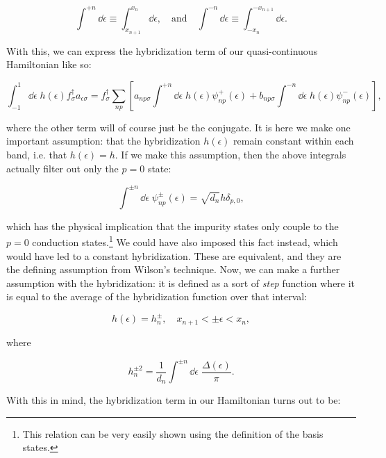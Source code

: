 \begin{equation}
  \int^{+n}\dd\epsilon \equiv \int_{x_{n+1}}^{x_n}\dd\epsilon, \quad\text{and}\quad \int^{-n}\dd\epsilon \equiv \int_{-x_n}^{-x_{n+1}}\dd\epsilon.
\end{equation}

With this, we can express the hybridization term of our quasi-continuous Hamiltonian like so:

\begin{equation}
  \int_{-1}^1\dd\epsilon \; h(\epsilon) f^\dagger_\sigma a_{\epsilon\sigma} = f^\dagger_\sigma \sum_{np} \left[ a_{np\sigma}\int^{+n}\dd\epsilon \; h(\epsilon)\psi^+_{np}(\epsilon) + b_{np\sigma}\int^{-n}\dd\epsilon \; h(\epsilon) \psi^-_{np}(\epsilon) \right],
\end{equation}

where the other term will of course just be the conjugate. It is here we make one important assumption: that the hybridization $h(\epsilon)$ remain constant within each band, i.e. that $h(\epsilon) = h$. If we make this assumption, then the above integrals actually filter out only the $p=0$ state:

\begin{equation}
  \int^{\pm n}\dd\epsilon \; \psi^{\pm}_{np}(\epsilon) = \sqrt{d_n}h\delta_{p,0},
\end{equation}

which has the physical implication that the impurity states only couple to the $p=0$ conduction states.\footnote{This relation can be very easily shown using the definition of the basis states.} We could have also imposed this fact instead, which would have led to a constant hybridization. These are equivalent, and they are the defining assumption from Wilson's technique. Now, we can make a further assumption with the hybridization: it is defined as a sort of \textit{step} function where it is equal to the average of the hybridization function over that interval:

\begin{equation}
  h(\epsilon) = h_n^{\pm},\quad x_{n+1} < \pm\epsilon < x_n,
\end{equation}

where

\begin{equation}
  h_n^{\pm 2} = \frac{1}{d_n} \int^{\pm n} \dd\epsilon \; \frac{\Delta(\epsilon)}{\pi}.
\end{equation}

With this in mind, the hybridization term in our Hamiltonian turns out to be:

